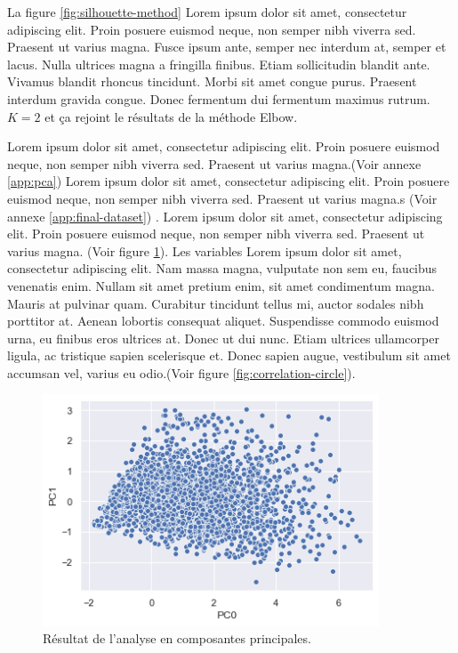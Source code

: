 La figure \ref{fig:silhouette-method} Lorem ipsum dolor sit amet, consectetur adipiscing elit. Proin posuere euismod neque, non semper nibh viverra sed. Praesent ut varius magna. Fusce ipsum ante, semper nec interdum at, semper et lacus. Nulla ultrices magna a fringilla finibus. Etiam sollicitudin blandit ante. Vivamus blandit rhoncus tincidunt. Morbi sit amet congue purus. Praesent interdum gravida congue. Donec fermentum dui fermentum maximus rutrum. $K = 2$ et ça rejoint le résultats de la méthode Elbow.

\medskip

Lorem ipsum dolor sit amet, consectetur adipiscing elit. Proin posuere euismod neque, non semper nibh viverra sed. Praesent ut varius magna.(Voir annexe \ref{app:pca}) Lorem ipsum dolor sit amet, consectetur adipiscing elit. Proin posuere euismod neque, non semper nibh viverra sed. Praesent ut varius magna.s (Voir annexe \ref{app:final-dataset}) . Lorem ipsum dolor sit amet, consectetur adipiscing elit. Proin posuere euismod neque, non semper nibh viverra sed. Praesent ut varius magna. (Voir figure \ref{fig:pca-method}). Les variables Lorem ipsum dolor sit amet, consectetur adipiscing elit. Nam massa magna, vulputate non sem eu, faucibus venenatis enim. Nullam sit amet pretium enim, sit amet condimentum magna. Mauris at pulvinar quam. Curabitur tincidunt tellus mi, auctor sodales nibh porttitor at. Aenean lobortis consequat aliquet. Suspendisse commodo euismod urna, eu finibus eros ultrices at. Donec ut dui nunc. Etiam ultrices ullamcorper ligula, ac tristique sapien scelerisque et. Donec sapien augue, vestibulum sit amet accumsan vel, varius eu odio.(Voir figure \ref{fig:correlation-circle}).


\begin{figure}[hbt!]
  \centering
  \includegraphics[width=10cm]{images_pfe/pca_results.png}
  \caption{Résultat de l'analyse en composantes principales.}
  \label{fig:pca-method}
\end{figure}
\FloatBarrier


